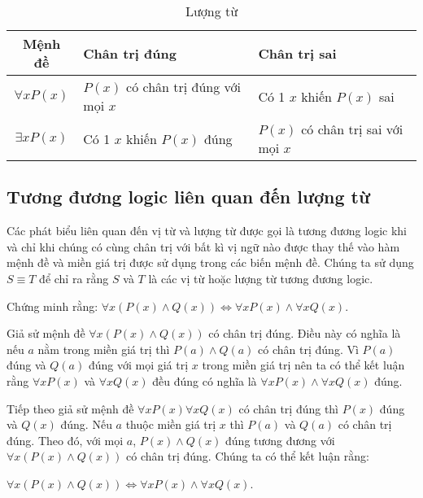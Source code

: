 \documentclass{standalone} %
\begin{document}
        \begin{table}[h!]
            \centering
            \setlength{\tabcolsep}{12pt}
            \begin{tabular}{| c| l| l|}
                \hline
                Mệnh đề & Chân trị đúng & Chân trị sai\\ \hline
                $\forall x P(x)$ & $P(x)$ có chân trị đúng với mọi $x$ & Có 1 $x$ khiến $P(x)$ sai\\
                $\exists x P(x)$ & Có 1 $x$ khiến $P(x)$ đúng & $P(x)$ có chân trị sai với mọi $x$\\
                \hline
            \end{tabular}
            \caption{Lượng từ}
        \end{table}
        
    \subsection{Tương đương logic liên quan đến lượng từ}
        
        \begin{definition}
            Các phát biểu liên quan đến vị từ và lượng từ được gọi là tương đương logic khi và chỉ khi chúng có cùng chân trị với bất kì vị ngữ nào được thay thế vào hàm mệnh đề và miền giá trị được sử dụng trong các biến mệnh đề. Chúng ta sử dụng $S \equiv T$ để chỉ ra rằng $S$ và $T$ là các vị từ hoặc lượng từ tương đương logic.
        \end{definition}
        
        \begin{example}
            Chứng minh rằng: $\forall x (P(x) \land Q(x)) \Leftrightarrow \forall x P(x) \land \forall x Q(x)$.
        \end{example}
        
        Giả sử mệnh đề $\forall x (P(x) \land Q(x))$ có chân trị đúng. Điều này có nghĩa là nếu $a$ nằm trong miền giá trị thì $P(a) \land Q(a)$ có chân trị đúng. Vì $P(a)$ đúng và $Q(a)$ đúng với mọi giá trị $x$ trong miền giá trị nên ta có thể kết luận rằng $\forall x P(x)$ và $\forall x Q(x)$ đều đúng có nghĩa là $\forall x P(x) \land \forall x Q(x)$ đúng.
        
        Tiếp theo giả sử mệnh đề $\forall x P(x) \forall x Q(x)$ có chân trị đúng thì $P(x)$ đúng và $Q(x)$ đúng. Nếu $a$ thuộc miền giá trị $x$ thì $P(a)$ và $Q(a)$ có chân trị đúng. Theo đó, với mọi $a$, $P(x) \land Q(x)$ đúng tương đương với $\forall x (P(x) \land Q(x))$ có chân trị đúng. Chúng ta có thể kết luận rằng:
        \begin{center}
            $\forall x (P(x) \land Q(x)) \Leftrightarrow \forall x P(x) \land \forall x Q(x)$.
        \end{center}
\end{document}

